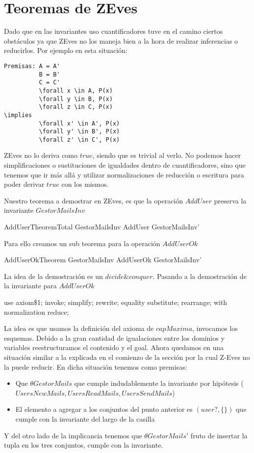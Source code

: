 \section{Teoremas de ZEves}

Dado que en las invariantes uso cuantificadores tuve en el camino ciertos obstáculos ya que ZEves no los maneja bien a la hora de realizar inferencias o reducirlos. Por ejemplo en esta situación:
\begin{verbatim}
Premisas: A = A'
          B = B'
          C = C'
          \forall x \in A, P(x)
          \forall y \in B, P(x)
          \forall z \in C, P(x)
\implies
          \forall x' \in A', P(x)
          \forall y' \in B', P(x)
          \forall z' \in C', P(x)
\end{verbatim}

ZEves no lo deriva como $true$, siendo que es trivial al verlo. No podemos hacer simplificaciones o sustituciones de igualdades dentro de cuantificadores, sino que tenemos que ir más allá y utilizar normalizaciones de reducción o escritura para poder derivar $true$ con los mismos.

Nuestro teorema a demostrar en ZEves, es que la operación $AddUser$ preserva la invariante $GestorMailsInv$

\begin{theorem}{AddUserTheoremTotal}
GestorMailsInv \land AddUser \implies GestorMailsInv'
\end{theorem}

Para ello creamos un sub teorema para la operación $AddUserOk$
\begin{theorem}{AddUserOkTheorem}
GestorMailsInv \land AddUserOk \implies GestorMailsInv'
\end{theorem}

La idea de la demostración es un $divide \& conquer$. Pasando a la demostración de la invariante para $AddUserOk$

\begin{zproof}[AddUserOkTheorem]
use axiom\$1;
invoke;
simplify;
rewrite;
equality substitute;
rearrange;
with normalization reduce;
\end{zproof}

La idea es que usamos la definición del axioma de $capMaxima$, invocamos los esquemas. Debido a la gran cantidad de igualaciones entre los dominios y variables reestructuramos el contenido y el goal. Ahora quedamos en una situación similar a la explicada en el comienzo de la sección por la cual Z-Eves no la puede reducir. En dicha situación tenemos como premisas:
\begin{itemize}
    \item Que  $\theta GestorMails$ que cumple indudablemente la invariante por hipótesis ($UsersNewMails,UsersReadMails,UsersSendMails$)
    \item El elemento a agregar a los conjuntos del punto anterior es $(user?,\{\})$ que cumple con la invariante del largo de la casilla
\end{itemize}
Y del otro lado de la implicancia tenemos que $\theta GestorMails'$ fruto de insertar la tupla en los tres conjuntos, cumple con la invariante.


